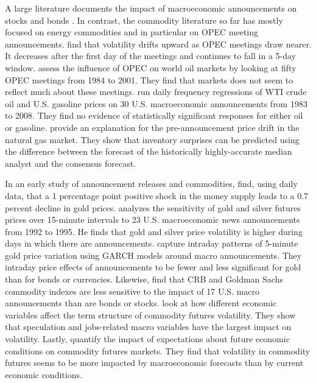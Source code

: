 \documentclass[12pt]{article}
\begin{document}
A large literature documents the impact of macroeconomic announcements on stocks \citep{boyd2005stock,andersen2003micro,hu2017early,scholtus2014speed} and bonds \citep{fleming1997moves,fleming1999price,balduzzi2001economic}. In contrast, the commodity literature so far has mostly focused on energy commodities and in particular on OPEC meeting announcements.  \citet{horan2004implied} find that volatility drifts upward as OPEC meetings draw nearer. It decreases  after the first day of the meetings and continues to fall in a 5-day window. \citet{wirl2004impact} assess the influence of OPEC on world oil markets by looking at fifty OPEC meetings from 1984 to 2001. They find that markets does not seem to reflect much about these meetings. \citet{kilian2011energy} run daily frequency regressions of WTI crude oil and U.S. gasoline prices on 30 U.S. macroeconomic announcements from 1983 to 2008. They find no evidence of statistically significant responses for either oil or gasoline.  \citet{gu2018drives} provide an explanation for the pre-announcement price drift in the natural gas market. They show that inventory surprises can be predicted using the difference between the forecast of the historically highly-accurate median analyst and the consensus forecast.



In an early study of announcement releases and commodities, \citet{frankel1985commodity}  find, using daily data, that a 1 percentage point positive shock in the money supply leads to a 0.7 percent decline in gold prices. \citet{christie2000macroeconomics} analyzes the sensitivity of gold and silver futures prices over 15-minute intervals to 23 U.S. macroeconomic news announcements from 1992 to 1995. He finds that gold and silver price volatility is higher during days in which there are announcements. \citet{cai2001moves} capture intraday patterns of 5-minute gold price variation using GARCH models around macro announcements. They intraday price effects of announcements to be fewer and less significant for gold than for bonds or currencies.  Likewise, \citet{hess2008commodity} find that CRB and Goldman Sachs commodity indexes are less sensitive to the impact of 17 U.S. macro announcements than are bonds or stocks.
 \citet{hollstein2020volatility} look at how different economic variables affect the term structure of commodity futures volatility. They show that speculation and jobs-related macro variables have the largest impact on volatility. Lastly, \citet{ye2021macroeconomic} quantify the impact of expectations about future economic conditions on commodity futures markets. They find that volatility in commodity futures seems to be more impacted by macroeconomic forecasts than by current economic conditions. 
\end{document}
